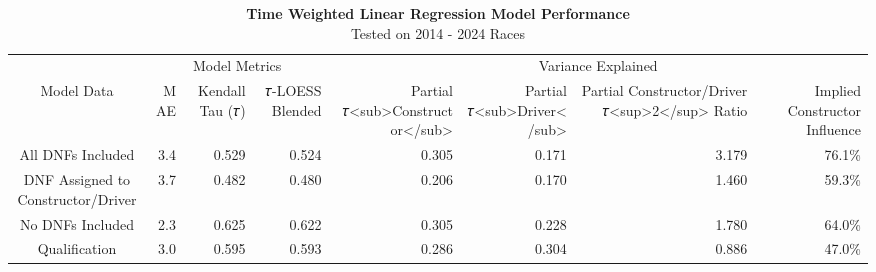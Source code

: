 \begin{table}[!t]
\caption*{
{\large \textbf{Time Weighted Linear Regression Model Performance}} \\ 
{\small Tested on 2014 - 2024 Races}
} 
\fontsize{10.5pt}{12.6pt}\selectfont
\begin{tabular*}{\linewidth}{@{\extracolsep{\fill}}crrrrrrr}
\toprule
 & \multicolumn{3}{c}{Model Metrics} & \multicolumn{4}{c}{Variance Explained} \\ 
\cmidrule(lr){2-4} \cmidrule(lr){5-8}
Model Data & MAE & Kendall Tau (𝜏) & 𝜏-LOESS Blended & Partial 𝜏<sub>Constructor</sub> & Partial 𝜏<sub>Driver</sub> & Partial Constructor/Driver 𝜏<sup>2</sup> Ratio & Implied Constructor Influence \\ 
\midrule\addlinespace[2.5pt]
All DNFs Included & {3.4} & {0.529} & {0.524} & {0.305} & {0.171} & {3.179} & {76.1\%} \\ 
DNF Assigned to Constructor/Driver & {3.7} & {0.482} & {0.480} & {0.206} & {0.170} & {1.460} & {59.3\%} \\ 
No DNFs Included & {2.3} & {0.625} & {0.622} & {0.305} & {0.228} & {1.780} & {64.0\%} \\ 
Qualification & {3.0} & {0.595} & {0.593} & {0.286} & {0.304} & {0.886} & {47.0\%} \\ 
\bottomrule
\end{tabular*}
\end{table}

